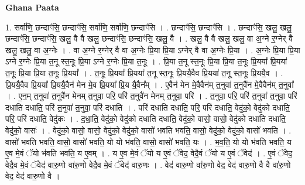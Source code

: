 \documentclass[17pt]{extarticle}
\begin{document}
\textbf{Ghana Paata } \newline

1. सर्वा॑णि॒ छन्दाꣳ॑सि॒ छन्दाꣳ॑सि॒ सर्वा॑णि॒ सर्वा॑णि॒ छन्दाꣳ॑सि । . छन्दाꣳ॑सि॒ छन्दाꣳ॑सि । . छन्दाꣳ॑सि॒ खलु॒ खलु॒ छन्दाꣳ॑सि॒ छन्दाꣳ॑सि॒ खलु॒ वै वै खलु॒ छन्दाꣳ॑सि॒ छन्दाꣳ॑सि॒ खलु॒ वै । . खलु॒ वै वै खलु॒ खलु॒ वा अ॒ग्ने र॒ग्नेर् वै खलु॒ खलु॒ वा अ॒ग्नेः । . वा अ॒ग्ने र॒ग्नेर् वै वा अ॒ग्नेः प्रि॒या प्रि॒या ऽग्नेर् वै वा अ॒ग्नेः प्रि॒या । . अ॒ग्नेः प्रि॒या प्रि॒या ऽग्ने र॒ग्नेः प्रि॒या त॒नू स्त॒नूः प्रि॒या ऽग्ने र॒ग्नेः प्रि॒या त॒नूः । . प्रि॒या त॒नू स्त॒नूः प्रि॒या प्रि॒या त॒नूः प्रि॒यया᳚ प्रि॒यया॑ त॒नूः प्रि॒या प्रि॒या त॒नूः प्रि॒यया᳚ । . त॒नूः प्रि॒यया᳚ प्रि॒यया॑ त॒नू स्त॒नूः प्रि॒ययै॒वैव प्रि॒यया॑ त॒नू स्त॒नूः प्रि॒ययै॒व । . प्रि॒ययै॒वैव प्रि॒यया᳚ प्रि॒ययै॒वैन॑ मेन मे॒व प्रि॒यया᳚ प्रि॒य यै॒वैन᳚म् । . ए॒वैन॑ मेन मे॒वैवैन॑म् त॒नुवा॑ त॒नुवै॑न मे॒वैवैन॑म् त॒नुवा᳚ । . ए॒न॒म् त॒नुवा॑ त॒नुवै॑न मेनम् त॒नुवा॒ परि॒ परि॑ त॒नुवै॑न मेनम् त॒नुवा॒ परि॑ । . त॒नुवा॒ परि॒ परि॑ त॒नुवा॑ त॒नुवा॒ परि॑ दधाति दधाति॒ परि॑ त॒नुवा॑ त॒नुवा॒ परि॑ दधाति । . परि॑ दधाति दधाति॒ परि॒ परि॑ दधाति॒ वेदु॑को॒ वेदु॑को दधाति॒ परि॒ परि॑ दधाति॒ वेदु॑कः । . द॒धा॒ति॒ वेदु॑को॒ वेदु॑को दधाति दधाति॒ वेदु॑को॒ वासो॒ वासो॒ वेदु॑को दधाति दधाति॒ वेदु॑को॒ वासः॑ । . वेदु॑को॒ वासो॒ वासो॒ वेदु॑को॒ वेदु॑को॒ वासो॑ भवति भवति॒ वासो॒ वेदु॑को॒ वेदु॑को॒ वासो॑ भवति । . वासो॑ भवति भवति॒ वासो॒ वासो॑ भवति॒ यो यो भ॑वति॒ वासो॒ वासो॑ भवति॒ यः । . भ॒व॒ति॒ यो यो भ॑वति भवति॒ य ए॒व मे॒वं ॅयो भ॑वति भवति॒ य ए॒वम् । . य ए॒व मे॒वं ॅयो य ए॒वं ॅवेद॒ वेदै॒वं ॅयो य ए॒वं ॅवेद॑ । . ए॒वं ॅवेद॒ वेदै॒व मे॒वं ॅवेद॑ वारु॒णो वा॑रु॒णो वेदै॒व मे॒वं ॅवेद॑ वारु॒णः । . वेद॑ वारु॒णो वा॑रु॒णो वेद॒ वेद॑ वारु॒णो वै वै वा॑रु॒णो वेद॒ वेद॑ वारु॒णो वै । \newline
\end{document}
